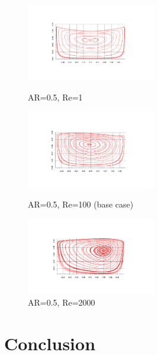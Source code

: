 \documentclass[twocolumn,10pt]{asme2ej}
\begin{document}
\begin{figure}[tbh]
\begin{center}
\includegraphics[width=0.5\textwidth]{figure/AR0.5-Re1 streamFunction axis final.pdf}
\caption{AR=0.5, Re=1}
\label{AR0.5RE1}

\includegraphics[width=0.5\textwidth]{figure/AR0.5-Re100 streamFunction axis final.pdf}
\caption{AR=0.5, Re=100 (base case)}
\label{AR0.5RE100}

\includegraphics[width=0.5\textwidth]{figure/AR0.5-Re2000 streamFunction axis final.pdf}
\caption{AR=0.5, Re=2000}
\label{AR0.5RE2000}
\end{center}
\end{figure}

\section{Conclusion}

\nocite{*}


\end{document}
